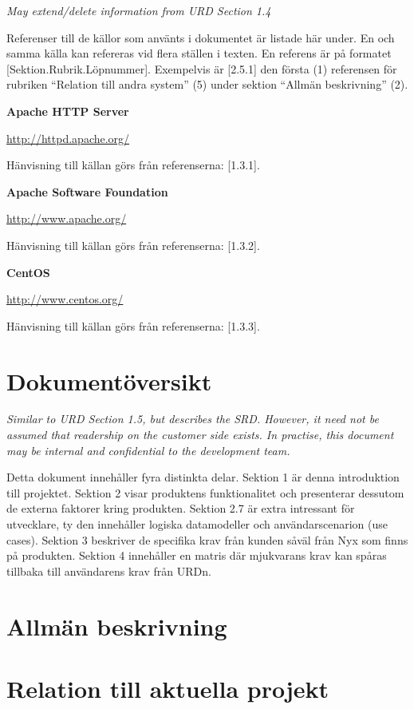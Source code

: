 \documentclass[a4paper, twoside, 11pt, titlepage]{article}
\begin{document}
\emph{May extend/delete information from URD Section 1.4}

Referenser till de källor som använts i dokumentet är listade här under. En och samma källa kan refereras vid flera ställen i texten. En referens är på formatet [Sektion.Rubrik.Löpnummer]. Exempelvis är [2.5.1] den första (1) referensen för rubriken ``Relation till andra system'' (5) under sektion ``Allmän beskrivning'' (2).

\textbf{Apache HTTP Server}

\url{http://httpd.apache.org/}

Hänvisning till källan görs från referenserna: [1.3.1].

\textbf{Apache Software Foundation}

\url{http://www.apache.org/}

Hänvisning till källan görs från referenserna: [1.3.2].

\textbf{CentOS}

\url{http://www.centos.org/}

Hänvisning till källan görs från referenserna: [1.3.3].

\clearpage
\section{Dokumentöversikt}


\emph{Similar to URD Section 1.5, but describes the SRD. However, it need not be assumed that readership on the customer side exists. In practise, this document may be internal and confidential to the development team.}

Detta dokument innehåller fyra distinkta delar. Sektion 1 är denna introduktion till projektet. Sektion 2 visar produktens funktionalitet och presenterar dessutom de externa faktorer kring produkten. Sektion 2.7 är extra intressant för utvecklare, ty den innehåller logiska datamodeller och användarscenarion (use cases).  Sektion 3 beskriver de specifika krav från kunden såväl från Nyx som finns på produkten. Sektion 4 innehåller en matris där mjukvarans krav kan spåras tillbaka till användarens krav från URDn.

\clearpage
\section{Allmän beskrivning}



\clearpage
\section{Relation till aktuella projekt}
\end{document}
